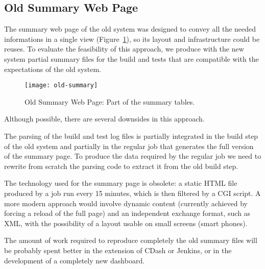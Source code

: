 \subsection{Old Summary Web Page}
\label{sec:Dashboard:Old}
The summary web page of the old system was designed to convey all the needed
informations in a single view (Figure~\ref{fig:old-summary}), so its layout and
infrastructure could be reuses.  To evaluate the feasibility of this approach,
we produce with the new system partial summary files for the build and tests
that are compatible with the expectations of the old system.

\begin{figure}
  \begin{center}
    \texttt{[image: old-summary]}
  \end{center}
  \caption{Old Summary Web Page: Part of the summary tables.}
  \label{fig:old-summary}
\end{figure}

Although possible, there are several downsides in this approach.

The parsing of the build and test log files is partially integrated in the build
step of the old system and partially in the regular job that generates the full
version of the summary page.  To produce the data required by the regular job we
need to rewrite from scratch the parsing code to extract it from the old build
step.

The technology used for the summary page is obsolete: a static HTML file
produced by a job run every 15 minutes, which is then filtered by a CGI script.
A more modern approach would involve dynamic content (currently achieved by
forcing a reload of the full page) and an independent exchange format, such as
XML, with the possibility of a layout usable on small screens (smart phones).

The amount of work required to reproduce completely the old summary files will
be probably spent better in the extension of CDash or Jenkins, or in the
development of a completely new dashboard.
